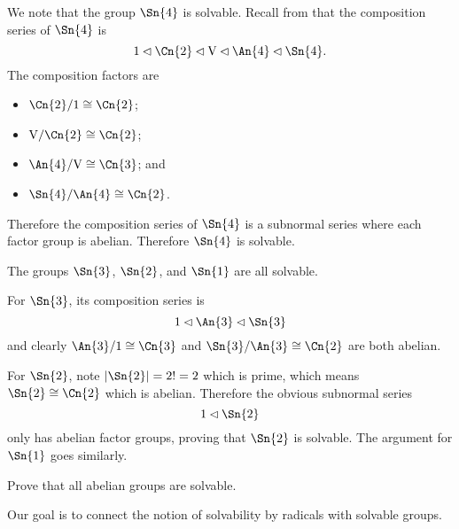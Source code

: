 \begin{example}
    We note that the group $\Sn{4}$ is solvable. Recall from   that the composition series of $\Sn{4}$ is
    \[
        1 \lhd \Cn{2} \lhd \mathrm{V} \lhd \An{4} \lhd \Sn{4}.
    \]
    The composition factors are
    \begin{itemize}
        \item $\Cn{2}/1 \cong \Cn{2}$;
        \item $\mathrm{V}/\Cn{2} \cong \Cn{2}$;
        \item $\An{4}/\mathrm{V} \cong \Cn{3}$; and
        \item $\Sn{4}/\An{4} \cong \Cn{2}$.
    \end{itemize}
    Therefore the composition series of $\Sn{4}$ is a subnormal series where each factor group is abelian. Therefore $\Sn{4}$ is solvable.
\end{example}

\begin{example}
    The groups $\Sn{3}$, $\Sn{2}$, and $\Sn{1}$ are all solvable.
    
    
    For $\Sn{3}$, its composition series is
    \[
        1 \lhd \An{3} \lhd \Sn{3}
    \]
    and clearly $\An{3}/1 \cong \Cn{3}$ and $\Sn{3}/\An{3} \cong \Cn{2}$ are both abelian.

    For $\Sn{2}$, note $|\Sn{2}| = 2! = 2$ which is prime, which means $\Sn{2} \cong \Cn{2}$ which is abelian. Therefore the obvious subnormal series
    \[
        1 \lhd \Sn{2}
    \]
    only has abelian factor groups, proving that $\Sn{2}$ is solvable. The argument for $\Sn{1}$ goes similarly.
\end{example}

\begin{exercise}\label{exercise-abelian-groups-are-solvable}
    Prove that all abelian groups are solvable.
\end{exercise}

Our goal is to connect the notion of solvability by radicals with solvable groups.

